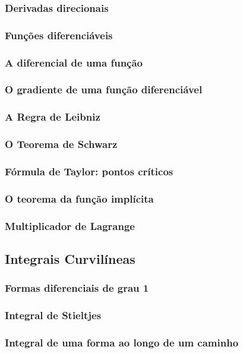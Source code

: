 \documentclass{article}
\theoremstyle{theorem}
\theoremstyle{lemma}
\theoremstyle{definition}
\theoremstyle{remark}
\begin{document}
   \subsubsection{Derivadas direcionais}
   \subsubsection{Funções diferenciáveis}
   \subsubsection{A diferencial de uma função}
   \subsubsection{O gradiente de uma função diferenciável}
   \subsubsection{A Regra de Leibniz}
   \subsubsection{O Teorema de Schwarz}
   \subsubsection{Fórmula de Taylor: pontos críticos}
   \subsubsection{O teorema da função implícita}
   \subsubsection{ Multiplicador de Lagrange}
\subsection{ Integrais Curvilíneas}
   \subsubsection{Formas diferenciais de grau 1}
   \subsubsection{Integral de Stieltjes}
   \subsubsection{Integral de uma forma ao longo de um caminho}
\end{document}
